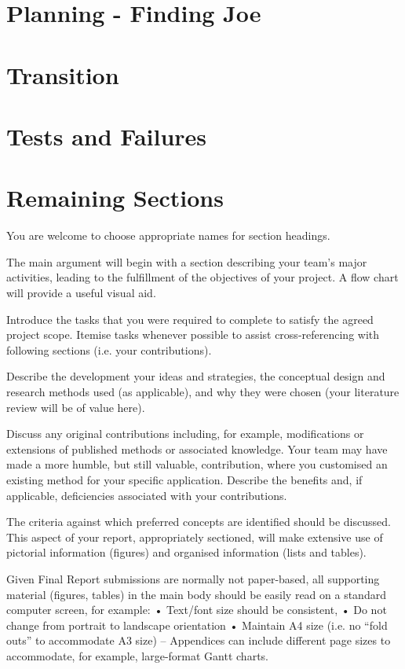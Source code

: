 \documentclass[]{article}
\begin{document}
\section{Planning - Finding Joe}


\section{Transition}


\section{Tests and Failures}


\section{Remaining Sections}
\color{red}
You are welcome to choose appropriate names for section headings.

The main argument will begin with a section describing your team's major activities, leading to the fulfillment of the objectives of your project.  A flow chart will provide a useful visual aid.

Introduce the tasks that you were required to complete to satisfy the agreed project scope. Itemise tasks whenever possible to assist cross-referencing with following sections (i.e. your contributions).

Describe the development your ideas and strategies, the conceptual design and research methods used (as applicable), and why they were chosen (your literature review will be of value here).  

Discuss any original contributions including, for example, modifications or extensions of published methods or associated knowledge.  Your team may have made a more humble, but still valuable, contribution, where you customised an existing method for your specific application.  Describe the benefits and, if applicable, deficiencies associated with your contributions.

The criteria against which preferred concepts are identified should be discussed.  This aspect of your report, appropriately sectioned, will make extensive use of pictorial information (figures) and organised information (lists and tables).  

Given Final Report submissions are normally not paper-based, all supporting material (figures, tables) in the main body should be easily read on a standard computer screen, for example:
•	Text/font size should be consistent, 
•	Do not change from portrait to landscape orientation 
•	Maintain A4 size (i.e. no “fold outs” to accommodate A3 size) – Appendices can include different page sizes to accommodate, for example, large-format Gantt charts.
\end{document}
